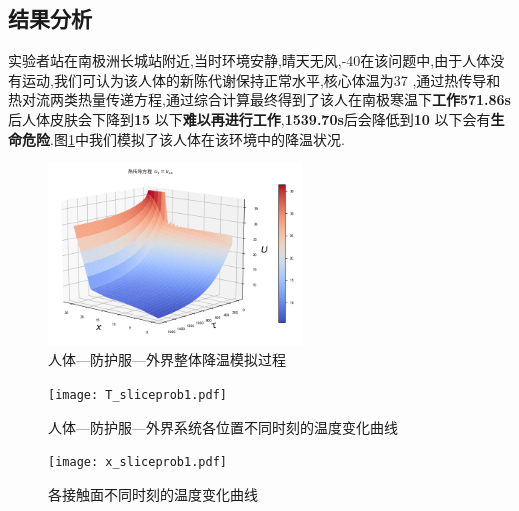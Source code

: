 \documentclass{whutmod}
\begin{document}
\subsection{结果分析}
实验者站在南极洲长城站附近,当时环境安静,晴天无风,-40\textcelsius 在该问题中,由于人体没有运动,我们可认为该人体的新陈代谢保持正常水平,核心体温为37 \textcelsius ,通过热传导和热对流两类热量传递方程,通过综合计算最终得到了该人在南极寒温下\textbf{工作571.86s}后人体皮肤会下降到\textbf{15} \textcelsius 以下\textbf{难以再进行工作},\textbf{1539.70s}后会降低到\textbf{10} \textcelsius 以下会有\textbf{生命危险}.图\ref{fig:T_surface_prob1}中我们模拟了该人体在该环境中的降温状况.
\begin{figure}[!htbp]
	\centering
	\includegraphics[width=0.6\textwidth]{T_surface_prob1.png}
	\caption{人体—防护服—外界整体降温模拟过程}
	\label{fig:T_surface_prob1}
\end{figure} 

\begin{figure}[!h]
\begin{minipage}[t]{0.48\textwidth}
	\centering
	\texttt{[image: T\_sliceprob1.pdf]}
	\caption{人体—防护服—外界系统各位置不同时刻的温度变化曲线}
\end{minipage}
\begin{minipage}[t]{0.48\textwidth}
	\centering
	\texttt{[image: x\_sliceprob1.pdf]}
\caption{各接触面不同时刻的温度变化曲线}
\end{minipage}
\end{figure}

\end{document}
